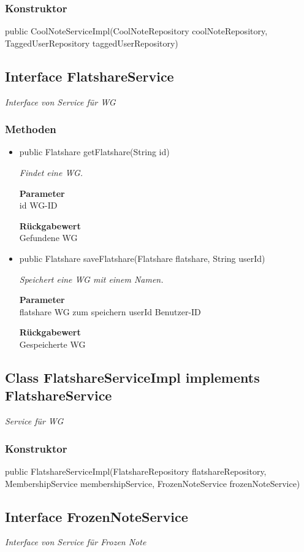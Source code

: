 \documentclass[a4paper]{scrreprt}
\begin{document}
        \subsubsection{Konstruktor}
        public CoolNoteServiceImpl(CoolNoteRepository coolNoteRepository, TaggedUserRepository taggedUserRepository)
        \subsection{Interface FlatshareService}
        \textit{Interface von Service für WG}
        \subsubsection{Methoden}
        \begin{itemize}
        	\item{public Flatshare getFlatshare(String id)}
        	
        	\textit{Findet eine WG.}
        	
        	\textbf{Parameter} \\
        	id WG-ID
        	
        	\textbf{Rückgabewert} \\
        	Gefundene WG        \item{public Flatshare saveFlatshare(Flatshare flatshare, String userId)}
        	
        	\textit{Speichert eine WG mit einem Namen.}
        	
        	\textbf{Parameter} \\
        	flatshare WG zum speichern
        	userId Benutzer-ID
        	
        	\textbf{Rückgabewert} \\
        	Gespeicherte WG
        \end{itemize}
        \subsection{Class FlatshareServiceImpl implements FlatshareService}
        \textit{Service für WG}
        \subsubsection{Konstruktor}
        public FlatshareServiceImpl(FlatshareRepository flatshareRepository, MembershipService membershipService, FrozenNoteService frozenNoteService)
        \subsection{Interface FrozenNoteService}
        \textit{Interface von Service für Frozen Note}
\end{document}
